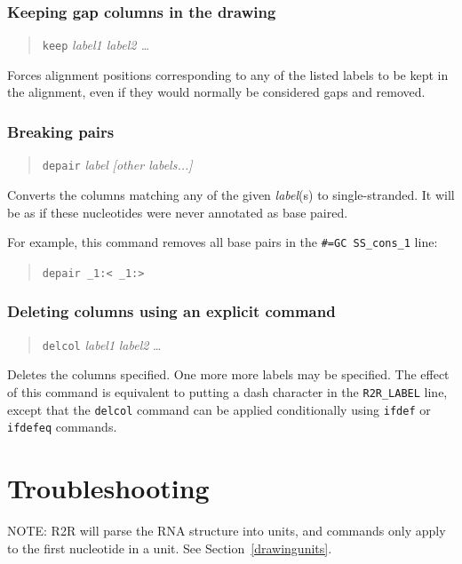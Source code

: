 \documentclass[letterpaper,12pt]{report}
\newcommand{\example}[1]{
\begin{quote}
{\raggedright
#1
}
\end{quote}
}
\begin{document}
\subsubsection{Keeping gap columns in the drawing}
\example{{\tt keep} \textit{label1  label2 {\dots}}}

Forces alignment positions corresponding to any of the listed labels to
be kept in the alignment, even if they would normally be considered
gaps and removed.

\subsubsection{Breaking pairs}

\example{{\tt depair} {\it label} {\it [other labels...]}}

Converts the columns matching any of the given {\it label}(s) to single-stranded.  It will be as if these nucleotides were never annotated as base paired.

For example, this command removes all base pairs in the {\tt \#=GC SS\_cons\_1} line:
\example{{\tt depair \_1:{\textless} \_1:{\textgreater}}}

\subsubsection{Deleting columns using an explicit command}
\example{
{\tt delcol} {\it label1} {\it label2} {\dots}
}

Deletes the columns specified.  One more more labels may be specified.
The effect of this command is equivalent to putting a dash character in the {\tt R2R\_LABEL} line, except that the 
{\tt delcol} command can be applied conditionally using {\tt ifdef} or {\tt ifdefeq} commands.

\section{Troubleshooting}

NOTE: R2R will parse the RNA structure into units, and commands only
apply to the first nucleotide in a unit.  
See Section~\ref{drawingunits}.
\end{document}
